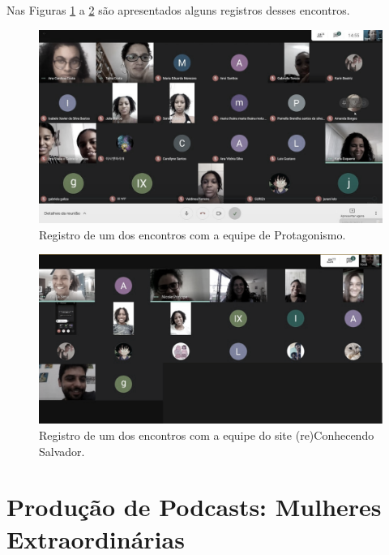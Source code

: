 \documentclass[
]{book}
\begin{document}
Nas Figuras \ref{fig:meetenctprot} a \ref{fig:meetenctsite} são apresentados alguns registros desses encontros.

\begin{figure}
\includegraphics[width=17.78in]{images/image125} \caption{Registro de um dos encontros com a equipe de Protagonismo.}\label{fig:meetenctprot}
\end{figure}

\begin{figure}
\includegraphics[width=18.38in]{images/image126} \caption{Registro de um dos encontros com a equipe do site (re)Conhecendo Salvador.}\label{fig:meetenctsite}
\end{figure}

\hypertarget{produuxe7uxe3o-de-podcasts-mulheres-extraordinuxe1rias}{%
\section{Produção de Podcasts: Mulheres Extraordinárias}\label{produuxe7uxe3o-de-podcasts-mulheres-extraordinuxe1rias}}
\end{document}
